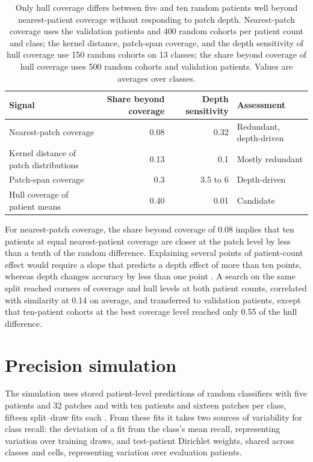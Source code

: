 \documentclass[11pt]{article}
\begin{document}
\begin{table}[htbp]
\centering
\renewcommand{\arraystretch}{1.15}
\begin{tabularx}{\textwidth}{@{}Yrrl@{}}
\toprule
Signal & Share beyond coverage & Depth sensitivity & Assessment \\
\midrule
Nearest-patch coverage & 0.08 & 0.32 & Redundant, depth-driven \\
Kernel distance of patch distributions & 0.13 & 0.1 & Mostly redundant \\
Patch-span coverage & 0.3 & 3.5 to 6 & Depth-driven \\
Hull coverage of patient means & 0.40 & 0.01 & Candidate \\
\bottomrule
\end{tabularx}
\caption{Only hull coverage differs between five and ten random patients well beyond nearest-patient coverage without responding to patch depth. Nearest-patch coverage uses the validation patients and 400 random cohorts per patient count and class; the kernel distance, patch-span coverage, and the depth sensitivity of hull coverage use 150 random cohorts on 13 classes; the share beyond coverage of hull coverage uses 500 random cohorts and validation patients. Values are averages over classes.}
\label{tab:screen}
\end{table}

\noindent For nearest-patch coverage, the share beyond coverage of 0.08 implies that ten patients at equal nearest-patient coverage are closer at the patch level by less than a tenth of the random difference. Explaining several points of patient-count effect would require a slope that predicts a depth effect of more than ten points, whereas depth changes accuracy by less than one point \citep{queisler2026effectiveSupport}. A search on the same split reached corners of coverage and hull levels at both patient counts, correlated with similarity at 0.14 on average, and transferred to validation patients, except that ten-patient cohorts at the best coverage level reached only 0.55 of the hull difference.

\section{Precision simulation}
\label{app:precision}
The simulation uses stored patient-level predictions of random classifiers with five patients and 32 patches and with ten patients and sixteen patches per class, fifteen split--draw fits each \citep{queisler2026effectiveSupport}. From these fits it takes two sources of variability for class recall: the deviation of a fit from the class's mean recall, representing variation over training draws, and test-patient Dirichlet weights, shared across classes and cells, representing variation over evaluation patients.
\end{document}
